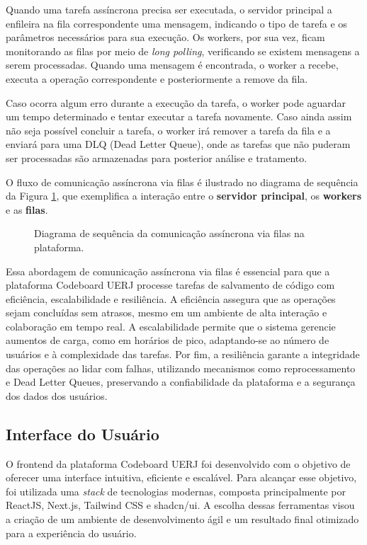 Quando uma tarefa assíncrona precisa ser executada, o servidor principal a enfileira na fila correspondente uma mensagem, indicando o tipo de tarefa e os parâmetros necessários para sua execução. Os workers, por sua vez, ficam monitorando as filas por meio de \emph{long polling}, verificando se existem mensagens a serem processadas. Quando uma mensagem é encontrada, o worker a recebe, executa a operação correspondente e posteriormente a remove da fila.

Caso ocorra algum erro durante a execução da tarefa, o worker pode aguardar um tempo determinado e tentar executar a tarefa novamente. Caso ainda assim não seja possível concluir a tarefa, o worker irá remover a tarefa da fila e a enviará para uma DLQ (Dead Letter Queue), onde as tarefas que não puderam ser processadas são armazenadas para posterior análise e tratamento.

O fluxo de comunicação assíncrona via filas é ilustrado no diagrama de sequência da Figura \ref{fig:queue-flow}, que exemplifica a interação entre o \textbf{servidor principal}, os \textbf{workers} e as \textbf{filas}.

\begin{figure}[H]
    \centering
    \caption{Diagrama de sequência da comunicação assíncrona via filas na plataforma.}
    \label{fig:queue-flow}
\end{figure}

Essa abordagem de comunicação assíncrona via filas é essencial para que a plataforma Codeboard UERJ processe tarefas de salvamento de código com eficiência, escalabilidade e resiliência. A eficiência assegura que as operações sejam concluídas sem atrasos, mesmo em um ambiente de alta interação e colaboração em tempo real. A escalabilidade permite que o sistema gerencie aumentos de carga, como em horários de pico, adaptando-se ao número de usuários e à complexidade das tarefas. Por fim, a resiliência garante a integridade das operações ao lidar com falhas, utilizando mecanismos como reprocessamento e Dead Letter Queues, preservando a confiabilidade da plataforma e a segurança dos dados dos usuários.


\subsection{Interface do Usuário}

O frontend da plataforma Codeboard UERJ foi desenvolvido com o objetivo de oferecer uma interface intuitiva, eficiente e escalável. Para alcançar esse objetivo, foi utilizada uma \emph{stack} de tecnologias modernas, composta principalmente por ReactJS, Next.js, Tailwind CSS e shadcn/ui. A escolha dessas ferramentas visou a criação de um ambiente de desenvolvimento ágil e um resultado final otimizado para a experiência do usuário.

